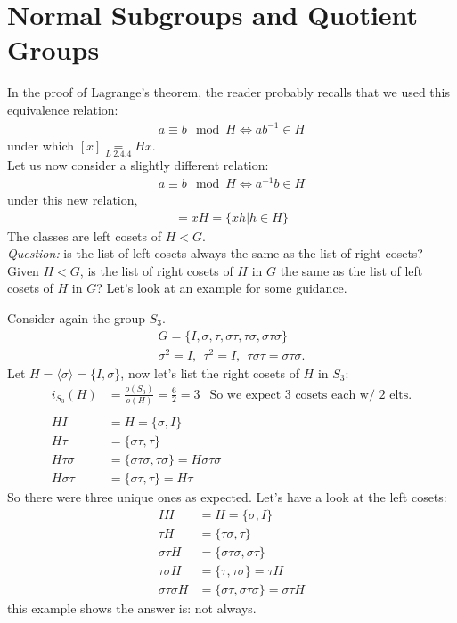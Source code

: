\section{Normal Subgroups and Quotient Groups}
In the proof of Lagrange's theorem, the reader probably recalls that we used this equivalence relation:
\begin{align}
    a\equiv b \mod H \iff ab^{-1}\in H \nonumber
\end{align}
under which $[x]\underset{L \ 2.4.4}{=}Hx$. \steezybreak\\
Let us now consider a slightly different relation:
\begin{align}
    a\equiv b \mod H \iff a^{-1}b\in H \nonumber
\end{align}
under this new relation, 
\begin{align}
    [x]=xH= \{xh|h\in H\} \nonumber
\end{align}
The classes are left cosets of $H<G$.\steezybreak\\
\textit{Question:} is the list of left cosets always the same as the list of right cosets? \steezybreak\\
Given $H<G$, is the list of right cosets of $H$ in $G$ the same as the list of left cosets of $H$ in $G$? Let's look at an example for some guidance.
\begin{example}
Consider again the group $S_3$.
\begin{align}
    G=\{I,\sigma,\tau,\sigma\tau,\tau\sigma,
    \sigma\tau\sigma \} \nonumber \\
    \sigma^2=I, \ \ \tau^2=I, \ \ \tau \sigma \tau = \sigma \tau \sigma. \nonumber
\end{align}
Let $H=\langle \sigma \rangle = \{I,\sigma \}$, now let's list the right cosets of $H$ in $S_3$:
\begin{align}
    i_{S_3}(H)&= \frac{o(S_3)}{o(H)}= \frac{6}{2}=3 \ \ \text{ So we expect 3 cosets each w/ 2 elts.} \nonumber \\ \nonumber \\
    HI &= H = \{\sigma, I\} \nonumber \\
    H\tau  &= \{\sigma\tau, \tau\} \nonumber \\
    H\tau\sigma  &= \{\sigma\tau\sigma, \tau\sigma\}=H\sigma\tau\sigma \nonumber \\
    H\sigma\tau  &= \{\sigma\tau, \tau\} = H\tau \nonumber 
\end{align}
So there were three unique ones as expected. Let's have a look at the left cosets:
\begin{align}
    IH  &= H= \{\sigma, I\}  \nonumber \\
    \tau H  &= \{\tau\sigma, \tau \}  \nonumber \\
    \sigma\tau H  &= \{\sigma\tau\sigma, \sigma\tau \}  \nonumber \\
    \tau\sigma H  &= \{\tau, \tau\sigma \} =\tau H \nonumber \\
    \sigma\tau\sigma H  &= \{\sigma\tau, \sigma\tau\sigma \} =\sigma\tau H \nonumber 
\end{align}
this example shows the answer is: not always.
\end{example}
